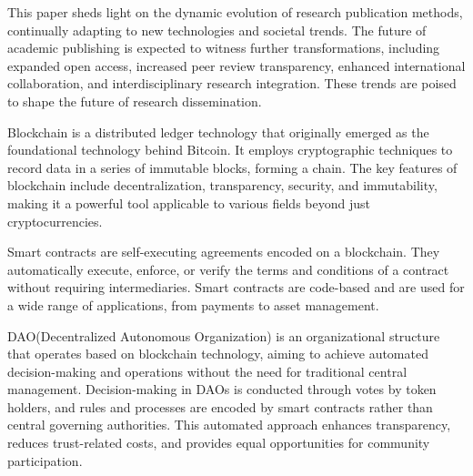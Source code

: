 \documentclass[lettersize,journal]{IEEEtran}
\begin{document}
This paper sheds light on the dynamic evolution of research publication methods, continually adapting to new technologies and societal trends. The future of academic publishing is expected to witness further transformations, including expanded open access, increased peer review transparency, enhanced international collaboration, and interdisciplinary research integration. These trends are poised to shape the future of research dissemination.

Blockchain is a distributed ledger technology that originally emerged as the foundational technology behind Bitcoin. It employs cryptographic techniques to record data in a series of immutable blocks, forming a chain. The key features of blockchain include decentralization, transparency, security, and immutability, making it a powerful tool applicable to various fields beyond just cryptocurrencies.

Smart contracts are self-executing agreements encoded on a blockchain. They automatically execute, enforce, or verify the terms and conditions of a contract without requiring intermediaries. Smart contracts are code-based and are used for a wide range of applications, from payments to asset management.

DAO(Decentralized Autonomous Organization) is an organizational structure that operates based on blockchain technology, aiming to achieve automated decision-making and operations without the need for traditional central management. Decision-making in DAOs is conducted through votes by token holders, and rules and processes are encoded by smart contracts rather than central governing authorities. This automated approach enhances transparency, reduces trust-related costs, and provides equal opportunities for community participation\cite{wang2019decentralized}. 
\end{document}
